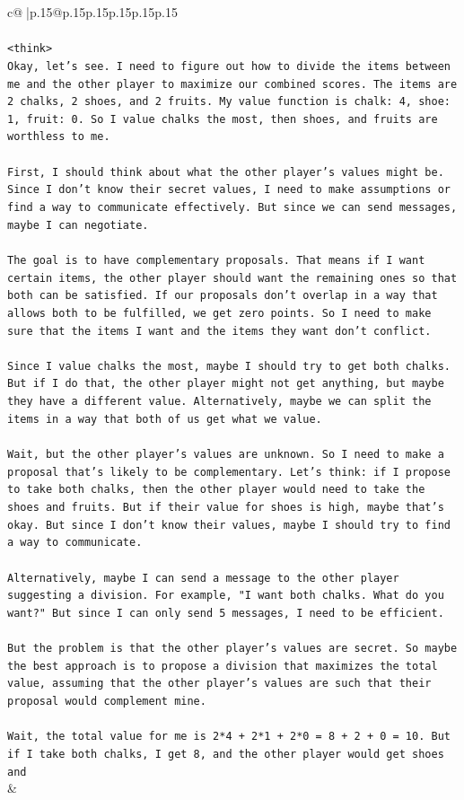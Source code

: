 \documentclass{article}
\begin{document}
{\begin{supertabular}{c@{$\;$}|p{.15\linewidth}@{}p{.15\linewidth}p{.15\linewidth}p{.15\linewidth}p{.15\linewidth}p{.15\linewidth}}
{{{\\ 
\\ 
\texttt{<think>} \\
\texttt{Okay, let's see. I need to figure out how to divide the items between me and the other player to maximize our combined scores. The items are 2 chalks, 2 shoes, and 2 fruits. My value function is chalk: 4, shoe: 1, fruit: 0. So I value chalks the most, then shoes, and fruits are worthless to me.} \\
\\ 
\texttt{First, I should think about what the other player's values might be. Since I don't know their secret values, I need to make assumptions or find a way to communicate effectively. But since we can send messages, maybe I can negotiate.} \\
\\ 
\texttt{The goal is to have complementary proposals. That means if I want certain items, the other player should want the remaining ones so that both can be satisfied. If our proposals don't overlap in a way that allows both to be fulfilled, we get zero points. So I need to make sure that the items I want and the items they want don't conflict.} \\
\\ 
\texttt{Since I value chalks the most, maybe I should try to get both chalks. But if I do that, the other player might not get anything, but maybe they have a different value. Alternatively, maybe we can split the items in a way that both of us get what we value.} \\
\\ 
\texttt{Wait, but the other player's values are unknown. So I need to make a proposal that's likely to be complementary. Let's think: if I propose to take both chalks, then the other player would need to take the shoes and fruits. But if their value for shoes is high, maybe that's okay. But since I don't know their values, maybe I should try to find a way to communicate.} \\
\\ 
\texttt{Alternatively, maybe I can send a message to the other player suggesting a division. For example, "I want both chalks. What do you want?" But since I can only send 5 messages, I need to be efficient.} \\
\\ 
\texttt{But the problem is that the other player's values are secret. So maybe the best approach is to propose a division that maximizes the total value, assuming that the other player's values are such that their proposal would complement mine.} \\
\\ 
\texttt{Wait, the total value for me is 2*4 + 2*1 + 2*0 = 8 + 2 + 0 = 10. But if I take both chalks, I get 8, and the other player would get shoes and} \\
            }
        }
    }
    & \\ \\


\end{supertabular}}
\end{document}
